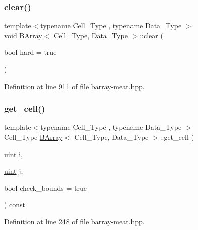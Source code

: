 \subsubsection{\texorpdfstring{clear()}{clear()}}
{\footnotesize\ttfamily template$<$typename Cell\+\_\+\+Type , typename Data\+\_\+\+Type $>$ \\
void \hyperlink{class_b_array}{B\+Array}$<$ Cell\+\_\+\+Type, Data\+\_\+\+Type $>$\+::clear (\begin{DoxyParamCaption}\item[{bool}]{hard = {\ttfamily true} }\end{DoxyParamCaption})\hspace{0.3cm}{\ttfamily [inline]}}



Definition at line 911 of file barray-\/meat.\+hpp.

\mbox{\label{class_b_array_a4096e4447f91ba52766587a08c62f1fa}} 
\subsubsection{\texorpdfstring{get\+\_\+cell()}{get\_cell()}}
{\footnotesize\ttfamily template$<$typename Cell\+\_\+\+Type , typename Data\+\_\+\+Type $>$ \\
Cell\+\_\+\+Type \hyperlink{class_b_array}{B\+Array}$<$ Cell\+\_\+\+Type, Data\+\_\+\+Type $>$\+::get\+\_\+cell (\begin{DoxyParamCaption}\item[{\hyperlink{typedefs_8hpp_a91ad9478d81a7aaf2593e8d9c3d06a14}{uint}}]{i,  }\item[{\hyperlink{typedefs_8hpp_a91ad9478d81a7aaf2593e8d9c3d06a14}{uint}}]{j,  }\item[{bool}]{check\+\_\+bounds = {\ttfamily true} }\end{DoxyParamCaption}) const\hspace{0.3cm}{\ttfamily [inline]}}



Definition at line 248 of file barray-\/meat.\+hpp.

\mbox{\label{class_b_array_a90bd31bc0b3fa59d11150cd4ea39b3b6}} 
